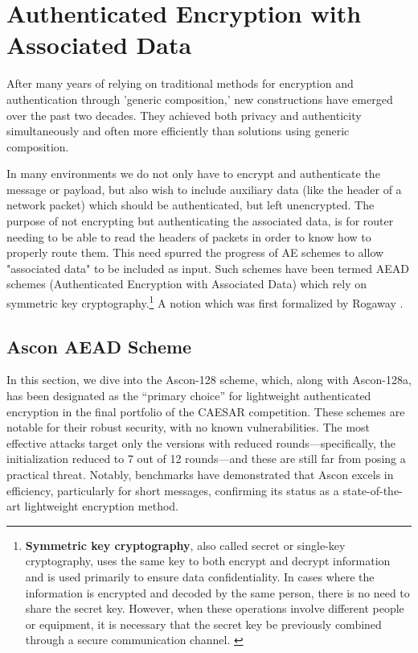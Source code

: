 \section{Authenticated Encryption with Associated Data}
After many years of relying on traditional methods for encryption and authentication through 'generic composition,' new constructions have emerged over the past two decades. They achieved both privacy and authenticity simultaneously and often more efficiently than solutions using generic composition. \par

In many environments we do not only have to encrypt and authenticate the message or payload, but also wish to include auxiliary data (like the header of a network packet) which should be authenticated, but left unencrypted. \cite[Chapter 1]{Black2005}
The purpose of not encrypting but authenticating the associated data, is for router needing to be able to read the headers of packets in order to know how to properly route them. This need spurred the progress of AE schemes to allow "associated data" to be included as input. Such schemes have been termed AEAD schemes (Authenticated Encryption with Associated Data) which rely on symmetric key cryptography.\footnote[1]{\textbf{Symmetric key cryptography}, also called secret or single-key cryptography, uses the same key to both encrypt and decrypt information and is used primarily to ensure data confidentiality. In cases where the information is encrypted and decoded by the same person, there is no need to share the secret key. However, when these operations involve different people or equipment, it is necessary that the secret key be previously combined through a secure communication channel. \cite{Alencar2022Cryptography}}\cite[Chapter 1]{Black2005}
A notion which was first formalized by Rogaway \cite{10.1145/586110.586125}. \par

\subsection{Ascon AEAD Scheme}
In this section, we dive into the Ascon-128 scheme, which, along with Ascon-128a, has been designated as the “primary choice” for lightweight authenticated encryption in the final portfolio of the CAESAR competition. These schemes are notable for their robust security, with no known vulnerabilities. The most effective attacks target only the versions with reduced rounds—specifically, the initialization reduced to 7 out of 12 rounds—and these are still far from posing a practical threat. Notably, benchmarks have demonstrated that Ascon excels in efficiency, particularly for short messages, confirming its status as a state-of-the-art lightweight encryption method. \cite[Chapter 1]{DBLP:journals/joc/DobraunigEMS21} \par

